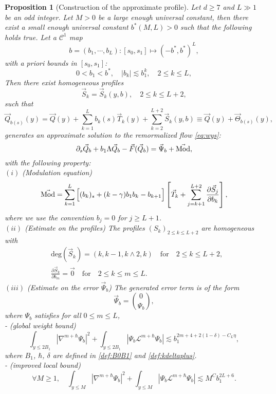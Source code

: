 \documentclass[11pt]{aims}
\newtheorem{proposition}[theorem]{Proposition}
\theoremstyle{definition}
\numberwithin{equation}{section}
\begin{document}
\begin{proposition}[Construction of the approximate profile] \label{prop:1}  Let $d \geq 7$ and $L \gg 1$ be an odd integer. Let $M > 0$ be a large enough universal constant, then there exist a small enough universal constant $b^*(M,L) > 0$ such that the following holds true. Let a ${\mathcal{C}}^1$ map
 $$b = (b_1, \cdots, b_L):[s_0,s_1] \mapsto (-b^*, b^*)^L,$$
with a priori bounds in $[s_0,s_1]$:
\begin{equation}\label{eq:relb1bk}
0 < b_1 < b^*, \quad |b_k| \lesssim b_1^k, \quad 2 \leq k \leq L, 
\end{equation}
Then there exist homogeneous profiles 
$$\vec S_k = \vec S_k(y,b), \quad 2 \leq k \leq L + 2,$$
such that
\begin{equation}\label{eq:Qbform}
\vec Q_{b(s)}(y) = \vec Q(y) + \sum_{k = 1}^L b_k(s)\vec T_k(y) + \sum_{k = 2}^{L+2}\vec S_k(y,b) \equiv \vec Q(y) + \vec\Theta_{b(s)}(y),
\end{equation}
generates an approximate solution to the remormalized flow \eqref{eq:wys}:
\begin{equation}\label{def:Psib}
\partial_s \vec Q_{b} + b_1 \Lambda \vec Q_b - \vec F(\vec Q_b) = \vec \Psi_b + \vec{\textup{Mod}},
\end{equation}
with the following property:\\
$(i)$ (Modulation equation)
\begin{equation}\label{eq:Modt}
\vec{\textup{Mod}} = \sum_{k = 1}^L\Big[(b_k)_s + (k - \gamma)b_1b_k - b_{k + 1}\Big] \left[\vec T_k + \sum_{j = k + 1}^{L+2}\frac{\partial \vec S_j}{\partial b_k}\right], 
\end{equation}
where we use the convention $b_{j} = 0$ for $j \geq L+1$.\\
$(ii)$ (Estimate on the profiles) The profiles $(S_k)_{2 \leq k \leq L+2}$ are homogeneous with
\begin{align*}
&\text{deg}(\vec S_k) = (k,k-1, k\wedge2 ,k) \quad \text{for} \quad 2 \leq k \leq L+2,\\
&\frac{\partial \vec S_k}{\partial b_m} = \vec 0 \quad \text{for}\quad 2 \leq k \leq m \leq L.
\end{align*}
$(iii)$ (Estimate on the error $\vec \Psi_b$)  The generated error term is of the form 
$$\vec \Psi_b = \binom{0}{\Psi_b},$$
where $\Psi_b$ satisfies for all $0 \leq m \leq L$,\\
- (global weight bound)
\begin{equation}\label{eq:estGlobalPsib}
\int_{y \leq 2B_1}|\nabla^{m + \hbar}\Psi_b |^2 + \int_{y \leq 2B_1}|\Psi_b {\mathscr{L}}^{m + \hbar}\Psi_b|\lesssim b_1^{2m + 4 + 2(1 - \delta) - C_L\eta},
\end{equation}
where $B_1$, $\hbar$, $\delta$ are defined in \eqref{def:B0B1} and \eqref{def:kdeltaplus}.\\
- (improved local bound)
\begin{equation}\label{eq:estlocalPsib}
\forall M \geq 1, \quad \int_{y \leq M}|\nabla^{m + \hbar}\Psi_b|^2 + \int_{y \leq M}|\Psi_b {\mathscr{L}}^{m + \hbar}\Psi_b| \lesssim M^Cb_1^{2L + 6}.
\end{equation}
\end{proposition}
\end{document}
